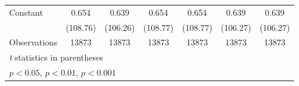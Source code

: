 {\begin{tabular}{l*{6}{c}}
Constant        &    0.654\sym{***}&    0.639\sym{***}&    0.654\sym{***}&    0.654\sym{***}&    0.639\sym{***}&    0.639\sym{***}\\
                & (108.76)         & (106.26)         & (108.77)         & (108.77)         & (106.27)         & (106.27)         \\
\hline
Observations    &    13873         &    13873         &    13873         &    13873         &    13873         &    13873         \\
\hline\hline
\multicolumn{7}{l}{\footnotesize \textit{t} statistics in parentheses}\\
\multicolumn{7}{l}{\footnotesize \sym{*} \(p<0.05\), \sym{**} \(p<0.01\), \sym{***} \(p<0.001\)}\\
\end{tabular}
}
